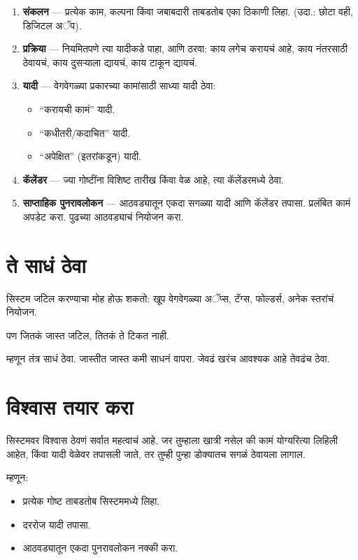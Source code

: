 \begin{enumerate}
\item \textbf{संकलन} —  
प्रत्येक काम, कल्पना किंवा जबाबदारी  
ताबडतोब एका ठिकाणी लिहा.  
(उदा.: छोटा वही, डिजिटल अॅप).  

\item \textbf{प्रक्रिया} —  
नियमितपणे त्या यादीकडे पाहा,  
आणि ठरवा:  
काय लगेच करायचं आहे,  
काय नंतरसाठी ठेवायचं,  
काय दुसऱ्याला द्यायचं,  
काय टाकून द्यायचं.  

\item \textbf{यादी} —  
वेगवेगळ्या प्रकारच्या कामांसाठी साध्या यादी ठेवा:  
\begin{itemize}
\item “करायची कामं” यादी.  
\item “कधीतरी/कदाचित” यादी.  
\item “अपेक्षित” (इतरांकडून) यादी.  
\end{itemize}

\item \textbf{कॅलेंडर} —  
ज्या गोष्टींना विशिष्ट तारीख किंवा वेळ आहे,  
त्या कॅलेंडरमध्ये ठेवा.  

\item \textbf{साप्ताहिक पुनरावलोकन} —  
आठवड्यातून एकदा सगळ्या यादी आणि कॅलेंडर तपासा.  
प्रलंबित कामं अपडेट करा.  
पुढच्या आठवड्याचं नियोजन करा.  
\end{enumerate}

\section*{ते साधं ठेवा}
सिस्टम जटिल करण्याचा मोह होऊ शकतो:  
खूप वेगवेगळ्या अॅप्स, टॅग्स, फोल्डर्स,  
अनेक स्तरांचं नियोजन.  

पण जितकं जास्त जटिल,  
तितकं ते टिकत नाही.  

म्हणून तंत्र साधं ठेवा.  
जास्तीत जास्त कमी साधनं वापरा.  
जेवढं खरंच आवश्यक आहे तेवढंच ठेवा.  

\section*{विश्वास तयार करा}
सिस्टमवर विश्वास ठेवणं सर्वात महत्वाचं आहे.  
जर तुम्हाला खात्री नसेल की कामं योग्यरित्या लिहिली आहेत,  
किंवा यादी वेळेवर तपासली जाते,  
तर तुम्ही पुन्हा डोक्यातच सगळं ठेवायला लागाल.  

म्हणून:  
\begin{itemize}
\item प्रत्येक गोष्ट ताबडतोब सिस्टममध्ये लिहा.  
\item दररोज यादी तपासा.  
\item आठवड्यातून एकदा पुनरावलोकन नक्की करा.  
\end{itemize}

